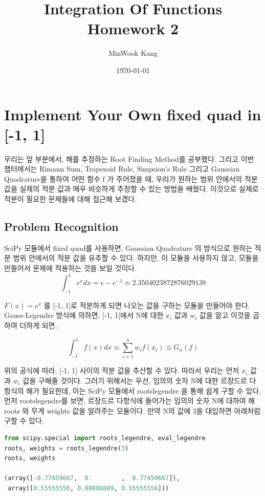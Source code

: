 \documentclass[11pt]{article}
\title{Integration Of Functions Homework 2}
\author{MinWook Kang}
\date{\today}
\begin{document}
\maketitle
\pagebreak





\section{Implement Your Own fixed quad in [-1, 1]}

우리는 앞 부분에서, 해를 추정하는 Root Finding Method를 공부했다. 그리고 이번 챕터에서는 Rimann Sum, Trapezoid Rule, Simpsion's Rule 그리고 Gaussian Quadrature을 통하여 어떤 함수 f 가 주어졌을 때, 우리가 원하는 범위 안에서의 적분 값을 실제의 적분 값과 매우 비슷하게 추정할 수 있는 방법을 배웠다. 이것으로 실제로 적분이 필요한 문제들에 대해 접근해 보겠다.
\subsection{Problem Recognition} 
SciPy 모듈에서 fixed quad를 사용하면, Gaussian Quadrature 의 방식으로 원하는 적분 범위 안에서의 적분 값을 유추할 수 있다. 하지만, 이 모듈을 사용하지 않고, 모듈을 만들어서 문제에 적용하는 것을 보일 것이다. 
\begin{equation}
\int_{-1}^{1} e^x dx = e - e^{-1} \approx 2.3504023872876029138
\end{equation}

$F(x) = e^x$ 를 [-1, 1]로 적분하게 되면 나오는 값을 구하는 모듈을 만들어야 한다. Gauss-Legendre 방식에 의하면, [-1, 1]에서 N에 대한 $x_i$ 값과 $w_i$ 값을 알고 이것을 곱하여 더하게 되면, 

\begin{equation}
\int_{-1}^1 f(x) dx \approx \sum_{i = 1}^n w_i f(x_i) \equiv G_n(f)
\end{equation}

위의 공식에 따라, [-1, 1] 사이의 적분 값을 추산할 수 있다. 따라서 우리는 먼저 $x_i$ 값과 $w_i$ 값을 구해줄 것이다. 그러기 위해서는 우선, 임의의 숫자 N에 대한 르장드르 다항식의 해가 필요한데, 이는  SciPy 모듈에서 roots\textunderscore legendre 을 통해 쉽게 구할 수 있다. 
먼저 roots\textunderscore legendre를 보면, 르장드르 다항식에 들어가는 임의의 숫자 N에 대하여 해 roots 와 무게 weights 값을 알려주는 모듈이다. 만약  N의 값에 3을 대입하면 아래처럼 구할 수 있다.

\begin{lstlisting}[language=Python]
from scipy.special import roots_legendre, eval_legendre
roots, weights = roots_legendre(3)
roots, weights

(array([-0.77459667,  0.        ,  0.77459667]),
 array([0.55555556, 0.88888889, 0.55555556]))
\end{lstlisting}
\end{document}
